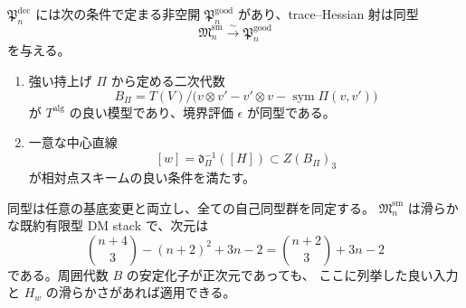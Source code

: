 \begin{theorem}
\label{thm:poisson-good-open-isomorphism}
$\mathfrak P_n^{\mathrm{dec}}$ には次の条件で定まる非空開
$\mathfrak P_n^{\mathrm{good}}$ があり、trace--Hessian 射は同型
\begin{equation}\label{eq:poisson-good-open-isomorphism}
 \mathfrak M_n^{\mathrm{sm}}\xrightarrow{\sim}
 \mathfrak P_n^{\mathrm{good}}
\end{equation}
を与える。
\begin{enumerate}
\item 強い持上げ $\Pi$ から定める二次代数
\[
 B_\Pi=T(V)/
 \bigl(v\otimes v'-v'\otimes v-\operatorname{sym}\Pi(v,v')\bigr)
\]
が $T^{\mathrm{alg}}$ の良い模型であり、境界評価 $\epsilon$ が同型である。
\item 一意な中心直線
\[
 [w]=\mathfrak d_\Pi^{-1}([H])\subset Z(B_\Pi)_3
\]
が相対点スキームの良い条件を満たす。
\end{enumerate}
同型は任意の基底変更と両立し、全ての自己同型群を同定する。
$\mathfrak M_n^{\mathrm{sm}}$ は滑らかな既約有限型 DM stack で、次元は
\[
 \binom{n+4}{3}-(n+2)^2+3n-2
 =\binom{n+2}{3}+3n-2
\]
である。周囲代数 $B$ の安定化子が正次元であっても、
ここに列挙した良い入力と $H_w$ の滑らかさがあれば適用できる。
\end{theorem}

